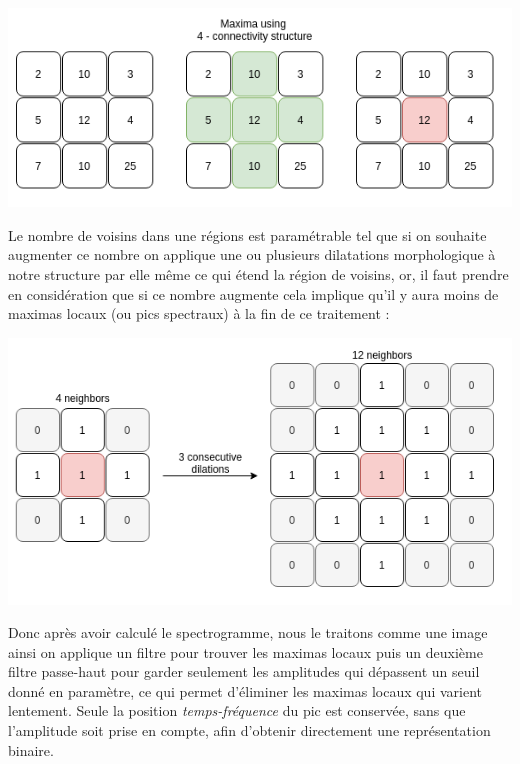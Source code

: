 \documentclass[11pt, report, french]{scrreprt}
\begin{document}
\begin{center}
	\includegraphics[scale=0.6]{img/maxima.png}
\end{center}

Le nombre de voisins dans une régions est paramétrable tel que si on souhaite augmenter ce nombre on applique une ou plusieurs dilatations morphologique à notre structure par elle même ce qui étend la région de voisins, or, il faut prendre en considération que si ce nombre augmente cela implique qu'il y aura moins de maximas locaux (ou pics spectraux) à la fin de ce traitement :

\begin{center}
	\includegraphics[scale=0.6]{img/dilation.png}
\end{center}

Donc après avoir calculé le spectrogramme, nous le traitons comme une image ainsi on applique un filtre pour trouver les maximas locaux puis un deuxième filtre passe-haut pour garder seulement les amplitudes qui dépassent un seuil donné en paramètre, ce qui permet d’éliminer les maximas locaux qui varient lentement. Seule la position \textit{temps-fréquence} du pic est conservée, sans que l’amplitude soit prise en compte, afin d’obtenir directement une représentation binaire.\\\par
\end{document}
